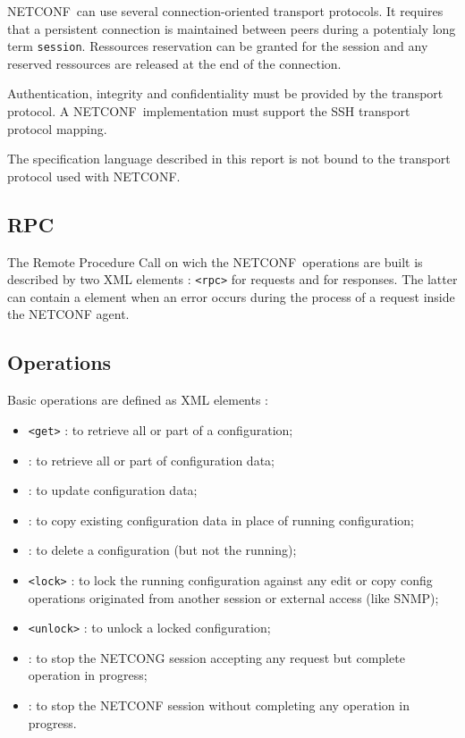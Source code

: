 \documentclass[a4paper]{article}
\newcommand{\nc}{NETCONF}
\begin{document}
\nc\  can  use several  connection-oriented  transport protocols.   It
requires  that a  persistent  connection is  maintained between  peers
during a  potentialy long term {\tt  session}.  Ressources reservation
can  be  granted for  the  session  and  any reserved  ressources  are
released at the end of the connection.

Authentication, integrity and confidentiality  must be provided by the
transport  protocol.  A  \nc\  implementation  must  support  the  SSH
transport protocol mapping.

The specification  language described in  this report is not  bound to
the transport protocol used with NETCONF.

\subsection{RPC}

The Remote  Procedure Call  on wich the  \nc\ operations are  built is
described  by two  XML\cite{Bray:00:EML}  elements :  {\tt <rpc>}  for
requests and {\tt <rpc-reply>}  for responses.  The latter can contain
a {\tt <rpc-error>} element when an error occurs during the process of
a request inside the NETCONF agent.

\subsection{Operations}


Basic operations are defined as XML elements :

\begin{itemize}
\item
{\tt <get>} : to retrieve all or part of a configuration;
\item
{\tt <get-config>} : to retrieve all or part of configuration data;
\item
{\tt <edit-config>} : to update configuration data;
\item
{\tt <copy-config>} : to copy existing configuration data in place of
running configuration;
\item
{\tt <delete-config>} : to delete a configuration (but not the running);
\item
{\tt <lock>} :  to lock the running configuration  against any edit or
copy  config operations  originated from  another session  or external
access (like SNMP);
\item
{\tt <unlock>} : to unlock a locked configuration;
\item
{\tt  <close-session>}  : to  stop  the  NETCONG  session accepting  any
request but complete operation in progress;
\item
{\tt <kill-session>} : to stop  the NETCONF session without completing any
operation in progress.
\end{itemize}
\end{document}
